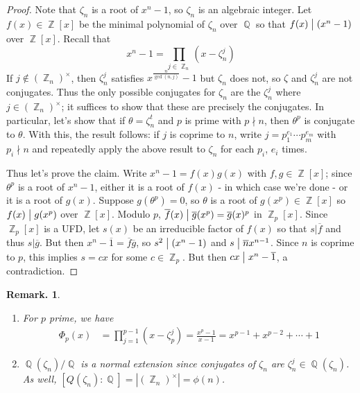 \documentclass[11pt, a4paper]{memoir}
\DeclareMathOperator{\Q}{{\mathbb{Q}}}
\DeclareMathOperator{\Z}{{\mathbb{Z}}}
\renewcommand{\div}{\bigm|}
\newcommand{\ol}[1]{\ensuremath{\overline{#1}}}
\theoremstyle{change}
\theoremstyle{plain}
\theoremstyle{nonumberplain}
\newtheorem{remark}{Remark.}
\newtheorem{proof}{Proof}
\begin{document}
\begin{proof}
    Note that $\zeta_n$ is a root of $x^n-1$, so $\zeta_n$ is an algebraic integer.
    Let $f(x)\in\Z[x]$ be the minimal polynomial of $\zeta_n$ over $\Q$ so that $f(x)\div(x^n-1)$ over $\Z[x]$.
    Recall that
    \begin{equation*}
        x^n-1=\prod\limits_{j\in\Z_n}(x-\zeta_n^j)
    \end{equation*}
    If $j\notin(\Z_n)^\times$, then $\zeta_n^j$ satisfies $x^{\frac{n}{\gcd(n,j)}}-1$ but $\zeta_n$ does not, so $\zeta$ and $\zeta_n^j$ are not conjugates.
    Thus the only possible conjugates for $\zeta_n$ are the $\zeta_n^j$ where $j\in(\Z_n)^\times$; it suffices to show that these are precisely the conjugates.
    In particular, let's show that if $\theta=\zeta_n^t$ and $p$ is prime with $p\nmid n$, then $\theta^p$ is conjugate to $\theta$.
    With this, the result follows: if $j$ is coprime to $n$, write $j=p_1^{e_1}\cdots p_m^{e_m}$ with $p_i\nmid n$ and repeatedly apply the above result to $\zeta_n$ for each $p_i$, $e_i$ times.

    Thus let's prove the claim.
    Write $x^n-1=f(x)g(x)$ with $f,g\in\Z[x]$; since $\theta^p$ is a root of $x^n-1$, either it is a root of $f(x)$ - in which case we're done - or it is a root of $g(x)$.
    Suppose $g(\theta^p)=0$, so $\theta$ is a root of $g(x^p)\in\Z[x]$ so $f(x)\div g(x^p)$ over $\Z[x]$.
    Modulo $p$, $\ol{f}(x)\div\ol{g}(x^p)=\ol{g}(x)^p$ in $\Z_p[x]$.
    Since $\Z_p[x]$ is a UFD, let $s(x)$ be an irreducible factor of $f(x)$ so that $s|\ol{f}$ and thus $s|\ol{g}$.
    But then $x^{n}-\ol{1}=\ol{f}\ol{g}$, so $s^2\div(x^n-1)$ and $s\div\ol{n}x^{n-1}$.
    Since $n$ is coprime to $p$, this implies $s=cx$ for some $c\in\Z_p$.
    But then $cx\div x^n-\ol{1}$, a contradiction.
\end{proof}
\begin{remark}
    \begin{enumerate}[nl]
        \item For $p$ prime, we have
            \begin{align*}
                \Phi_p(x) &= \prod\limits_{j=1}^{p-1}(x-\zeta_p^j)= \frac{x^p-1}{x-1}= x^{p-1}+x^{p-2}+\cdots+1
            \end{align*}
        \item $\Q(\zeta_n)/\Q$ is a normal extension since conjugates of $\zeta_n$ are $\zeta_n^j\in\Q(\zeta_n)$.
            As well, $[Q(\zeta_n):\Q]=|(\Z_n)^\times|=\phi(n)$.
    \end{enumerate}
\end{remark}
\end{document}
